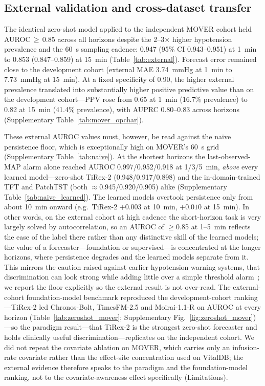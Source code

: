 \documentclass[11pt]{article}
\begin{document}
\subsection{External validation and cross-dataset transfer}

The identical zero-shot model applied to the independent MOVER cohort held
AUROC\,$\geq$\,0.85 across all horizons despite the 2--3$\times$ higher
hypotension prevalence and the 60~s sampling cadence: 0.947 (95\% CI
0.943--0.951) at 1~min to 0.853 (0.847--0.859) at 15~min
(Table~\ref{tab:external}). Forecast error remained close to the
development cohort (external MAE 3.74~mmHg at 1~min to 7.73~mmHg at 15~min).
At a fixed specificity of 0.90, the higher external prevalence translated
into substantially higher positive predictive value than on the development
cohort---PPV rose from 0.65 at 1~min (16.7\% prevalence) to 0.82 at 15~min
(41.4\% prevalence), with AUPRC 0.80--0.83 across horizons
(Supplementary Table~\ref{tab:mover_opchar}).

These external AUROC values must, however, be read against the naive
persistence floor, which is exceptionally high on MOVER's 60~s grid
(Supplementary Table~\ref{tab:naive}). At the shortest horizons the
last-observed-MAP alarm alone reached AUROC 0.997/0.952/0.918 at 1/3/5~min,
\emph{above} every learned model---zero-shot TiRex-2 (0.948/0.917/0.898) and
the in-domain-trained TFT and PatchTST (both $\approx$0.945/0.920/0.905)
alike (Supplementary Table~\ref{tab:naive_learned}). The learned models
overtook persistence only from about 10~min onward (e.g.\ TiRex-2 $+0.003$ at
10~min, $+0.010$ at 15~min). In other words, on the external cohort at high
cadence the short-horizon task is very largely solved by autocorrelation, so
an AUROC of $\geq$0.85 at 1--5~min reflects the ease of the label there
rather than any distinctive skill of the learned models; the value of a
forecaster---foundation or supervised---is concentrated at the longer
horizons, where persistence degrades and the learned models separate from it.
This mirrors the caution raised against earlier hypotension-warning systems,
that discrimination can look strong while adding little over a simple
threshold alarm~\citep{Enevoldsen2022,Vistisen2024}; we report the floor
explicitly so the external result is not over-read.
The external-cohort foundation-model benchmark reproduced the
development-cohort ranking---TiRex-2 led Chronos-Bolt, TimesFM-2.5 and
Moirai-1.1-R on AUROC at every horizon
(Table~\ref{tab:zeroshot_mover}; Supplementary Fig.~\ref{fig:zeroshot_mover})---so the
paradigm result---that TiRex-2 is the strongest zero-shot forecaster and
holds clinically useful discrimination---replicates on the independent
cohort. We did not repeat the covariate ablation on MOVER, which carries
only an infusion-rate covariate rather than the effect-site concentration
used on VitalDB; the external evidence therefore speaks to the paradigm and
the foundation-model ranking, not to the covariate-awareness effect
specifically (Limitations).
\end{document}
